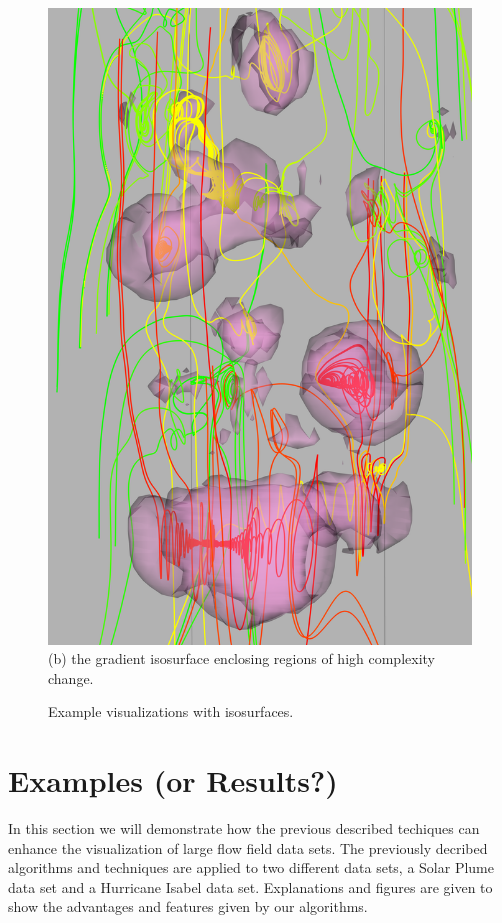 \documentclass{egpubl}
\begin{document}
\begin{figure}[h]
\begin{minipage}{0.47\linewidth}
                        \includegraphics[height = 1.47\linewidth]{Images/grad_crop.png}\\(b) the gradient isosurface enclosing regions of high complexity change. \vspace{0.2em}
                \end{minipage}
        \caption{Example visualizations with isosurfaces.}
        \label{fig:iso}
\end{figure}

\section{Examples (or Results?)} \label{sec:examples}

In this section we will demonstrate how the previous described techiques can enhance the visualization of large flow field data sets.
The previously decribed algorithms and techniques are applied to two different data sets, a Solar Plume data set and a Hurricane Isabel data set.
Explanations and figures are given to show the advantages and features given by our algorithms.
\end{document}
